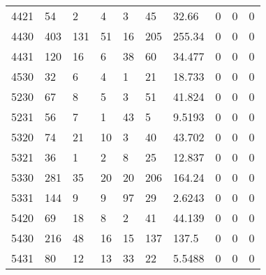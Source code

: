 \begin{longtable}{llllllllll}
4421 & 54            & 2                & 4                  & 3                & 45                 & 32.66  & 0 & 0 & 0 \\
4430 & 403           & 131              & 51                 & 16               & 205                & 255.34 & 0 & 0 & 0 \\
4431 & 120           & 16               & 6                  & 38               & 60                 & 34.477 & 0 & 0 & 0 \\
4530 & 32            & 6                & 4                  & 1                & 21                 & 18.733 & 0 & 0 & 0 \\
5230 & 67            & 8                & 5                  & 3                & 51                 & 41.824 & 0 & 0 & 0 \\
5231 & 56            & 7                & 1                  & 43               & 5                  & 9.5193 & 0 & 0 & 0 \\
5320 & 74            & 21               & 10                 & 3                & 40                 & 43.702 & 0 & 0 & 0 \\
5321 & 36            & 1                & 2                  & 8                & 25                 & 12.837 & 0 & 0 & 0 \\
5330 & 281           & 35               & 20                 & 20               & 206                & 164.24 & 0 & 0 & 0 \\
5331 & 144           & 9                & 9                  & 97               & 29                 & 2.6243 & 0 & 0 & 0 \\
5420 & 69            & 18               & 8                  & 2                & 41                 & 44.139 & 0 & 0 & 0 \\
5430 & 216           & 48               & 16                 & 15               & 137                & 137.5  & 0 & 0 & 0 \\
5431 & 80            & 12               & 13                 & 33               & 22                 & 5.5488 & 0 & 0 & 0 \\ \hline
\end{longtable}